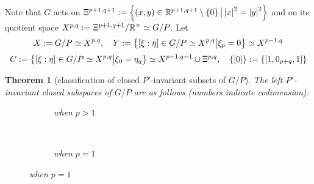 \documentclass[10pt]{article} %
\newtheorem{theorem}{Theorem}
\theoremstyle{definition}
\begin{document}
Note that $G$ acts on $\Xi^{p+1,q+1}:=\left\{(x,y)\in\mathbb{R}^{p+1,q+1}\setminus\left\{ 0 \right\}\big| \left|x\right|^2=\left|y\right|^2\right\}$ and on its quotient space
$X^{p,q}:=\Xi^{p+1,q+1}/\mathbb{R}^{\times}\simeq G/P$. Let
\[
	X:=G/P\simeq X^{p,q},\quad Y:=\left\{[\xi:\eta]\in G/P\simeq X^{p,q}\big| \xi_{p}=0\right\}\simeq X^{p-1,q}\]
	\[C:=\left\{[\xi:\eta]\in G/P\simeq X^{p,q}\big| \xi_{0}=\eta_q\right\}\simeq X^{p-1,q-1}\cup\Xi^{p,q},\quad\left\{ [0] \right\}:=\left\{ [1,0_{p+q},1] \right\}\]
\begin{theorem}[classification of closed $P'$-invariant subsets of $G/P$]
	The left $P'$-invariant closed subspaces of $G/P$ are as follows (numbers indicate codimension):\\
  \begin{figure}[H]
    \centering
    \begin{subfigure}[t]{0.3\textwidth}
	    \xymatrixrowsep{0.5pc}
	\caption{when $p>1$}
    \end{subfigure}
    ~ %
    \begin{subfigure}[t]{0.3\textwidth}
	    \xymatrixrowsep{0.5pc}
	    {}
	\caption{when $p=1$}
    \end{subfigure}
\end{figure}
\end{theorem}
\end{document}
